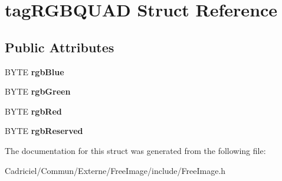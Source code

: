 \hypertarget{structtag_r_g_b_q_u_a_d}{}\section{tag\+R\+G\+B\+Q\+U\+AD Struct Reference}
\label{structtag_r_g_b_q_u_a_d}
\subsection*{Public Attributes}
\begin{DoxyCompactItemize}
\item 
B\+Y\+TE {\bfseries rgb\+Blue}\hypertarget{structtag_r_g_b_q_u_a_d_ad99c50770a73c6fae3ee1ea627da1c60}{}\label{structtag_r_g_b_q_u_a_d_ad99c50770a73c6fae3ee1ea627da1c60}

\item 
B\+Y\+TE {\bfseries rgb\+Green}\hypertarget{structtag_r_g_b_q_u_a_d_a4dae0a7db2f4d432cb4da3de4ef337bd}{}\label{structtag_r_g_b_q_u_a_d_a4dae0a7db2f4d432cb4da3de4ef337bd}

\item 
B\+Y\+TE {\bfseries rgb\+Red}\hypertarget{structtag_r_g_b_q_u_a_d_aa143fcd3ff08a04b152bee9d410821a6}{}\label{structtag_r_g_b_q_u_a_d_aa143fcd3ff08a04b152bee9d410821a6}

\item 
B\+Y\+TE {\bfseries rgb\+Reserved}\hypertarget{structtag_r_g_b_q_u_a_d_a2758aec56e37d4f3f5fde511a58f4f82}{}\label{structtag_r_g_b_q_u_a_d_a2758aec56e37d4f3f5fde511a58f4f82}

\end{DoxyCompactItemize}


The documentation for this struct was generated from the following file\+:\begin{DoxyCompactItemize}
\item 
Cadriciel/\+Commun/\+Externe/\+Free\+Image/include/Free\+Image.\+h\end{DoxyCompactItemize}
